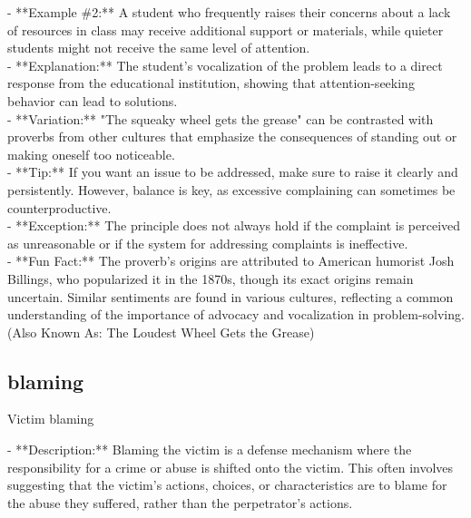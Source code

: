 \documentclass[a4paper,12pt,single,pdftex]{scrartcl}
\begin{document}
    
      - **Example \#2:** A student who frequently raises their concerns about a lack of resources in class may receive additional support or materials, while quieter students might not receive the same level of attention.
    \\

    
      - **Explanation:** The student's vocalization of the problem leads to a direct response from the educational institution, showing that attention-seeking behavior can lead to solutions.
    \\

    
      - **Variation:** "The squeaky wheel gets the grease" can be contrasted with proverbs from other cultures that emphasize the consequences of standing out or making oneself too noticeable.
    \\

    
      - **Tip:** If you want an issue to be addressed, make sure to raise it clearly and persistently. However, balance is key, as excessive complaining can sometimes be counterproductive.
    \\

    
      - **Exception:** The principle does not always hold if the complaint is perceived as unreasonable or if the system for addressing complaints is ineffective.
    \\

    
      - **Fun Fact:** The proverb's origins are attributed to American humorist Josh Billings, who popularized it in the 1870s, though its exact origins remain uncertain. Similar sentiments are found in various cultures, reflecting a common understanding of the importance of advocacy and vocalization in problem-solving.
    \\

  
    
      (Also Known As: The Loudest Wheel Gets the Grease)
    \\

  \subsection{blaming}


Victim blaming
    
      - **Description:** Blaming the victim is a defense mechanism where the responsibility for a crime or abuse is shifted onto the victim. This often involves suggesting that the victim’s actions, choices, or characteristics are to blame for the abuse they suffered, rather than the perpetrator’s actions.
    \\
\end{document}
